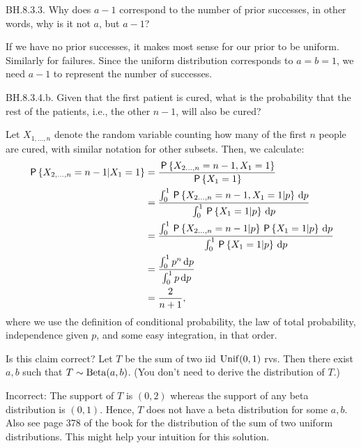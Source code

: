 \begin{exercise}
BH.8.3.3. Why does $a-1$ correspond to  the number of prior successes, in other words, why is it not $a$, but $a-1$?
\begin{solution}
If we have no prior successes, it makes most sense for our prior to be uniform. Similarly for failures. Since the uniform distribution corresponds to $a=b=1$, we need $a-1$ to represent the number of successes.
\end{solution}
\end{exercise}

\begin{exercise}
BH.8.3.4.b. Given that the first patient is cured, what is the probability that the rest of the patients, i.e., the other $n-1$, will also be cured?
\begin{solution}
Let $X_{1,\dots,n}$ denote the random variable counting how many of the first $n$ people are cured, with similar notation for other subsets. Then, we calculate:
\begin{align*}
    \,\mathsf{P}\left\{X_{2,\dots,n}=n-1|X_1=1\right\} &= \frac{\,\mathsf{P}\left\{X_{2\dots,n}=n-1, X_1=1\right\}}{\,\mathsf{P}\left\{X_1=1\right\}}\\
    &= \frac{\int_0^1 \,\mathsf{P}\left\{X_{2\dots,n}=n-1, X_1=1|p\right\}\,\textrm{d}p}{\int_0^1 \,\mathsf{P}\left\{X_1=1|p\right\}\,\textrm{d}p}\\
    &= \frac{\int_0^1 \,\mathsf{P}\left\{X_{2\dots,n}=n-1|p\right\}\,\mathsf{P}\left\{X_1=1|p\right\}\,\textrm{d}p}{\int_0^1 \,\mathsf{P}\left\{X_1=1|p\right\}\,\textrm{d}p}\\
    &= \frac{\int_0^1 p^n\,\textrm{d}p}{\int_0^1 p \,\textrm{d}p}\\
    &= \frac{2}{n+1},
\end{align*}
where we use the definition of conditional probability, the law of total probability, independence given $p$, and some easy integration, in that order.
\end{solution}
\end{exercise}


\begin{exercise}
Is this claim correct? Let $T$ be the sum of two iid $\mathrm{Unif}(0,1)$ rvs.
Then there exist $a, b$ such that $T \sim \mathrm{Beta}(a,b)$. (You don't need to derive the distribution of $T$.)
\begin{solution}
Incorrect: The support of $T$ is $(0,2)$ whereas the support of any beta distribution is $(0,1)$. Hence, $T$ does not have a beta distribution for some $a,b$.\\
Also see page 378 of the book for the distribution of the sum of two uniform distributions. This might help your intuition for this solution.
\end{solution}
\end{exercise}

